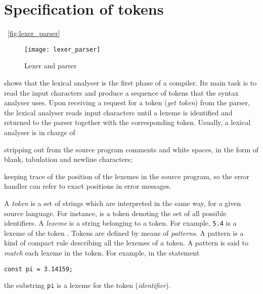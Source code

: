 \section{Specification of tokens}

\Fig~\vref{fig:lexer_parser}
\begin{figure}[b]
\centering
\texttt{[image: lexer\_parser]}
\caption{Lexer and parser\label{fig:lexer_parser}}
\end{figure}
shows that the lexical analyser is the first phase of a compiler. Its
main task is to read the input characters and produce a sequence of
tokens that the syntax analyser uses. Upon receiving a request for a
token (\emph{get token}) from the parser, the lexical analyser reads
input characters until a lexeme is identified and returned to the
parser together with the corresponding token. Usually, a lexical
analyser is in charge of
\begin{itemize*}

  \item stripping out from the source program comments and white
    spaces, in the form of blank, tabulation and newline characters;

  \item keeping trace of the position of the lexemes in the source
    program, so the error handler can refer to exact positions in
    error messages.

\end{itemize*}
A \emph{token} is a set of strings which are interpreted in the same
way, for a given source language. For instance,  is a
token denoting the set of all possible identifiers. A \emph{lexeme} is
a string belonging to a token. For example, \verb+5.4+ is a lexeme of
the token . Tokens are defined by means of
\emph{patterns}. A pattern is a kind of compact rule describing all
the lexemes of a token. A pattern is said to \emph{match} each lexeme
in the token. For example, in the \Pascal statement
\begin{verbatim}
const pi = 3.14159;
\end{verbatim}
the substring \texttt{pi} is a lexeme for the token 
(\emph{identifier}).

